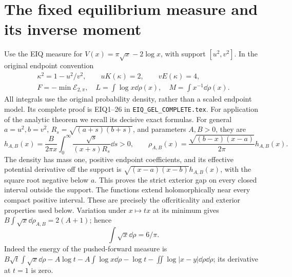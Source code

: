 \section{The fixed equilibrium measure and its inverse moment}
Use the EIQ measure for $V(x)=\pi\sqrt x-2\log x$, with support
$[u^2,v^2]$. In the original endpoint convention
\begin{equation}\tag{AG5}
\begin{gathered}
 \kappa^2=1-u^2/v^2,\qquad uK(\kappa)=2,\qquad vE(\kappa)=4,\\
 F=-\min\mathcal E_{2,\pi},\quad
 L=\int\log x\dd\rho(x),\quad M=\int x^{-1}\dd\rho(x).
\end{gathered}
\end{equation}
All integrals use the original probability density, rather than a scaled
endpoint model. Its complete proof is EIQ1--26 in
\texttt{EIQ\_GEL\_COMPLETE.tex}. For application of the analytic theorem
we recall its decisive exact formulas. For general $a=u^2,b=v^2$,
$R_s=\sqrt{(a+s)(b+s)}$, and parameters $A,B>0$, they are
\begin{equation}\tag{AG6}
 h_{A,B}(x)=\frac{B}{2\pi x}\int_0^\infty
 \frac{\sqrt s}{(x+s)R_s}\dd s>0,\qquad
 \rho_{A,B}(x)=\frac{\sqrt{(b-x)(x-a)}}{2\pi}h_{A,B}(x).
\end{equation}
The density has mass one, positive endpoint coefficients, and its effective
potential derivative off the support is
$\sqrt{(x-a)(x-b)}h_{A,B}(x)$, with the square root negative below $a$.
This proves the strict exterior gap on every closed interval outside the
support. The functions extend holomorphically near every compact positive
interval. These are precisely the offcriticality and exterior properties
used below. Variation under $x\mapsto tx$ at its minimum gives
$B\int\sqrt x\dd\rho_{A,B}=2(A+1)$; hence
\begin{equation}\tag{AG7}
 \int\sqrt x\dd\rho=6/\pi.
\end{equation}
Indeed the energy of the pushed-forward measure is
$B\sqrt t\int\sqrt x\dd\rho-A\log t-A\int\log x\dd\rho
-\log t-\iint\log|x-y|\dd\rho\dd\rho$; its derivative at $t=1$ is zero.


